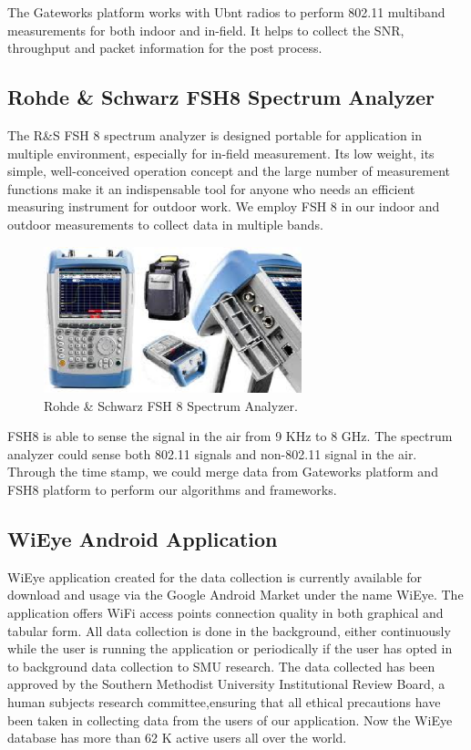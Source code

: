 The Gateworks platform works with Ubnt radios to perform 802.11 
multiband measurements for both indoor and in-field. It helps to 
collect the SNR, throughput and packet information for the post 
process. 

\subsection{Rohde \& Schwarz FSH8 Spectrum Analyzer}

The R\&S FSH 8 spectrum analyzer is designed portable for application 
in multiple environment, especially for in-field measurement. Its low 
weight, its simple, well-conceived operation concept and the large number 
of measurement functions make it an indispensable tool for anyone who 
needs an efficient measuring instrument for outdoor work. We employ 
FSH 8 in our indoor and outdoor measurements to collect data in multiple
bands.

\begin{figure} 
\centering
\includegraphics[width=75mm]{figures/fsh8}
\vspace{-0.1in}
\caption{Rohde \& Schwarz FSH 8 Spectrum Analyzer.}
\label{fig:fsh8}
\vspace{0.1in}
\end{figure}

FSH8 is able to sense the signal in the air from 9 KHz to 
8 GHz. The spectrum analyzer could sense both 802.11 signals 
and non-802.11 signal in the air. Through the time stamp, 
we could merge data from Gateworks platform and FSH8 platform 
to perform our algorithms and frameworks.


\subsection{WiEye Android Application}
WiEye application created for the data collection is currently available for download and usage via the Google Android 
Market under the name WiEye. The application offers WiFi access points connection quality in both graphical and tabular 
form. All data collection is done in the background, either continuously while the user is running the application or 
periodically if the user has opted in to background data collection to SMU research. 
The data collected has been approved by the Southern Methodist University Institutional Review Board, a human subjects 
research committee,ensuring that all ethical precautions have been taken in collecting data from the users of our 
application.
Now the WiEye database has more than 62 K active users all over the world.

